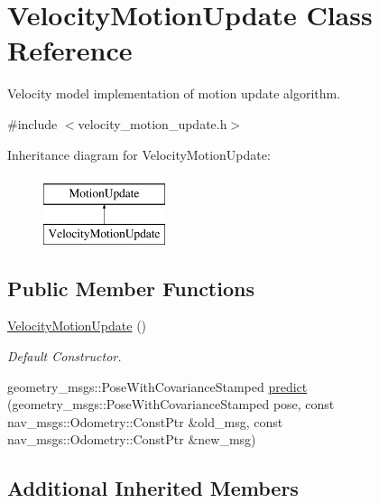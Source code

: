 \hypertarget{classVelocityMotionUpdate}{\section{Velocity\-Motion\-Update Class Reference}
\label{classVelocityMotionUpdate}
}


Velocity model implementation of motion update algorithm.  




{\ttfamily \#include $<$velocity\-\_\-motion\-\_\-update.\-h$>$}

Inheritance diagram for Velocity\-Motion\-Update\-:\begin{figure}[H]
\begin{center}
\leavevmode
\includegraphics[height=2.000000cm]{classVelocityMotionUpdate}
\end{center}
\end{figure}
\subsection*{Public Member Functions}
\begin{DoxyCompactItemize}
\item 
\hypertarget{classVelocityMotionUpdate_a7a9a88ec65e09028cdcfd2c821b4c1bd}{\hyperlink{classVelocityMotionUpdate_a7a9a88ec65e09028cdcfd2c821b4c1bd}{Velocity\-Motion\-Update} ()}\label{classVelocityMotionUpdate_a7a9a88ec65e09028cdcfd2c821b4c1bd}

\begin{DoxyCompactList}\small\item\em Default Constructor. \end{DoxyCompactList}\item 
geometry\-\_\-msgs\-::\-Pose\-With\-Covariance\-Stamped \hyperlink{classVelocityMotionUpdate_a1b532d900fd3393e70f7a70f153c3e08}{predict} (geometry\-\_\-msgs\-::\-Pose\-With\-Covariance\-Stamped pose, const nav\-\_\-msgs\-::\-Odometry\-::\-Const\-Ptr \&old\-\_\-msg, const nav\-\_\-msgs\-::\-Odometry\-::\-Const\-Ptr \&new\-\_\-msg)
\end{DoxyCompactItemize}
\subsection*{Additional Inherited Members}


